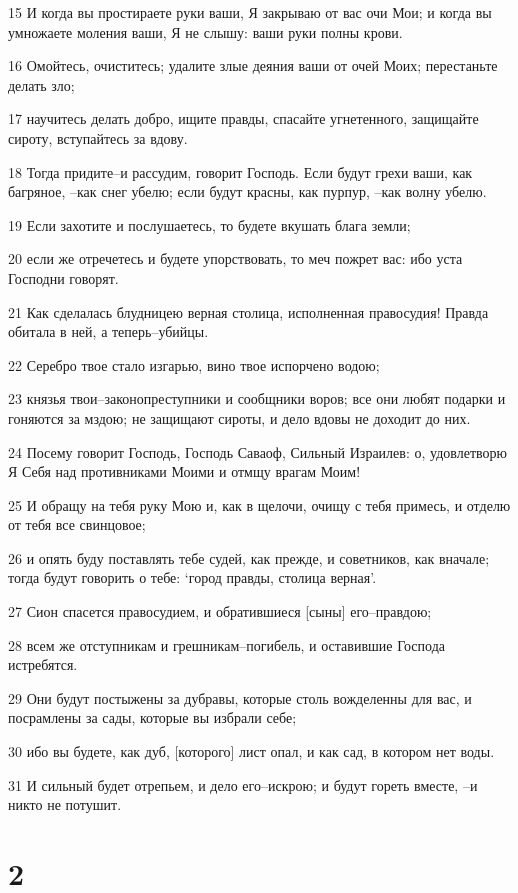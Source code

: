 \par 15 И когда вы простираете руки ваши, Я закрываю от вас очи Мои; и когда вы умножаете моления ваши, Я не слышу: ваши руки полны крови.
\par 16 Омойтесь, очиститесь; удалите злые деяния ваши от очей Моих; перестаньте делать зло;
\par 17 научитесь делать добро, ищите правды, спасайте угнетенного, защищайте сироту, вступайтесь за вдову.
\par 18 Тогда придите--и рассудим, говорит Господь. Если будут грехи ваши, как багряное, --как снег убелю; если будут красны, как пурпур, --как волну убелю.
\par 19 Если захотите и послушаетесь, то будете вкушать блага земли;
\par 20 если же отречетесь и будете упорствовать, то меч пожрет вас: ибо уста Господни говорят.
\par 21 Как сделалась блудницею верная столица, исполненная правосудия! Правда обитала в ней, а теперь--убийцы.
\par 22 Серебро твое стало изгарью, вино твое испорчено водою;
\par 23 князья твои--законопреступники и сообщники воров; все они любят подарки и гоняются за мздою; не защищают сироты, и дело вдовы не доходит до них.
\par 24 Посему говорит Господь, Господь Саваоф, Сильный Израилев: о, удовлетворю Я Себя над противниками Моими и отмщу врагам Моим!
\par 25 И обращу на тебя руку Мою и, как в щелочи, очищу с тебя примесь, и отделю от тебя все свинцовое;
\par 26 и опять буду поставлять тебе судей, как прежде, и советников, как вначале; тогда будут говорить о тебе: `город правды, столица верная'.
\par 27 Сион спасется правосудием, и обратившиеся [сыны] его--правдою;
\par 28 всем же отступникам и грешникам--погибель, и оставившие Господа истребятся.
\par 29 Они будут постыжены за дубравы, которые столь вожделенны для вас, и посрамлены за сады, которые вы избрали себе;
\par 30 ибо вы будете, как дуб, [которого] лист опал, и как сад, в котором нет воды.
\par 31 И сильный будет отрепьем, и дело его--искрою; и будут гореть вместе, --и никто не потушит.

\chapter{2}

